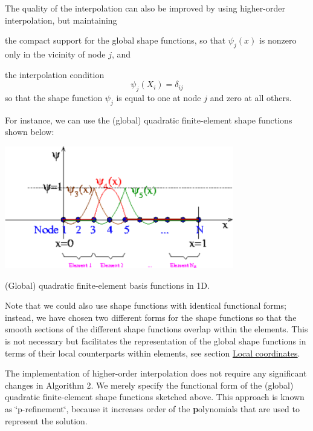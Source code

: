 The quality of the interpolation can also be improved by using higher-\/order interpolation, but maintaining
\begin{DoxyItemize}
\item the compact support for the global shape functions, so that $ \psi_j(x) $ is nonzero only in the vicinity of node $ j $, and
\item the interpolation condition \[ \psi_j(X_i) = \delta_{ij} \] so that the shape function $ \psi_j $ is equal to one at node $ j $ and zero at all others.
\end{DoxyItemize}For instance, we can use the (global) quadratic finite-\/element shape functions shown below\-:  
\begin{DoxyImage}
\includegraphics[width=0.75\textwidth]{1Dmesh_with_quadratic_shape_fcts}
\caption{(Global) quadratic finite-\/element basis functions in 1\-D. }
\end{DoxyImage}
 Note that we could also use shape functions with identical functional forms; instead, we have chosen two different forms for the shape functions so that the smooth sections of the different shape functions overlap within the elements. This is not necessary but facilitates the representation of the global shape functions in terms of their local counterparts within elements, see section \hyperlink{index_local_coords}{Local coordinates}.

The implementation of higher-\/order interpolation does not require any significant changes in Algorithm 2. We merely specify the functional form of the (global) quadratic finite-\/element shape functions sketched above. This approach is known as \char`\"{}p-\/refinement\char`\"{}, because it increases order of the {\bfseries p}olynomials that are used to represent the solution.



 

